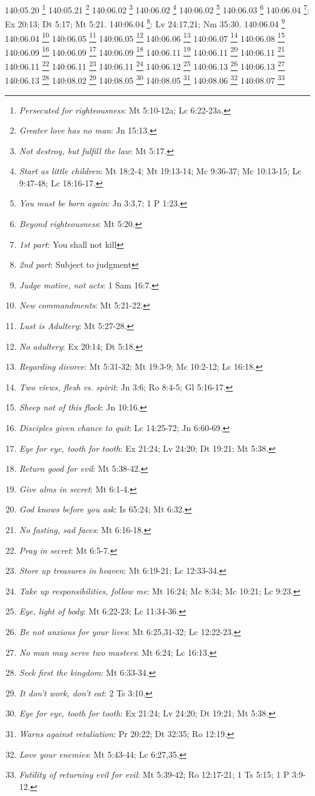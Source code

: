 {{{{{{{{{{{{{{{{{{{{{{{{{{{{{{{{{140:05.20 \footnote{\textit{Persecuted for righteousness}: Mt 5:10-12a; Lc 6:22-23a.}
140:05.21 \footnote{\textit{Greater love has no man}: Jn 15:13.}
140:06.02 \footnote{\textit{Not destroy, but fulfill the law}: Mt 5:17.}
140:06.02 \footnote{\textit{Start as little children}: Mt 18:2-4; Mt 19:13-14; Mc 9:36-37; Mc 10:13-15; Lc 9:47-48; Lc 18:16-17.}
140:06.02 \footnote{\textit{You must be born again}: Jn 3:3,7; 1 P 1:23.}
140:06.03 \footnote{\textit{Beyond righteousness}: Mt 5:20.}
140:06.04 \footnote{\textit{1st part}: You shall not kill}: Ex 20:13; Dt 5:17; Mt 5:21.}
140:06.04 \footnote{\textit{2nd part}: Subject to judgment}: Lv 24:17,21; Nm 35:30.}
140:06.04 \footnote{\textit{Judge motive, not acts}: 1 Sam 16:7.}
140:06.04 \footnote{\textit{New commandments}: Mt 5:21-22.}
140:06.05 \footnote{\textit{Lust is Adultery}: Mt 5:27-28.}
140:06.05 \footnote{\textit{No adultery}: Ex 20:14; Dt 5:18.}
140:06.06 \footnote{\textit{Regarding divorce}: Mt 5:31-32; Mt 19:3-9; Mc 10:2-12; Lc 16:18.}
140:06.07 \footnote{\textit{Two views, flesh vs. spirit}: Jn 3:6; Ro 8:4-5; Gl 5:16-17.}
140:06.08 \footnote{\textit{Sheep not of this flock}: Jn 10:16.}
140:06.09 \footnote{\textit{Disciples given chance to quit}: Lc 14:25-72; Jn 6:60-69.}
140:06.09 \footnote{\textit{Eye for eye, tooth for tooth}: Ex 21:24; Lv 24:20; Dt 19:21; Mt 5:38.}
140:06.09 \footnote{\textit{Return good for evil}: Mt 5:38-42.}
140:06.11 \footnote{\textit{Give alms in secret}: Mt 6:1-4.}
140:06.11 \footnote{\textit{God knows before you ask}: Is 65:24; Mt 6:32.}
140:06.11 \footnote{\textit{No fasting, sad faces}: Mt 6:16-18.}
140:06.11 \footnote{\textit{Pray in secret}: Mt 6:5-7.}
140:06.11 \footnote{\textit{Store up treasures in heaven}: Mt 6:19-21; Lc 12:33-34.}
140:06.11 \footnote{\textit{Take up responsibilities, follow me}: Mt 16:24; Mc 8:34; Mc 10:21; Lc 9:23.}
140:06.12 \footnote{\textit{Eye, light of body}: Mt 6:22-23; Lc 11:34-36.}
140:06.13 \footnote{\textit{Be not anxious for your lives}: Mt 6:25,31-32; Lc 12:22-23.}
140:06.13 \footnote{\textit{No man may serve two masters}: Mt 6:24; Lc 16:13.}
140:06.13 \footnote{\textit{Seek first the kingdom}: Mt 6:33-34.}
140:08.02 \footnote{\textit{It don't work, don't eat}: 2 Ts 3:10.}
140:08.05 \footnote{\textit{Eye for eye, tooth for tooth}: Ex 21:24; Lv 24:20; Dt 19:21; Mt 5:38.}
140:08.05 \footnote{\textit{Warns against retaliation}: Pr 20:22; Dt 32:35; Ro 12:19.}
140:08.06 \footnote{\textit{Love your enemies}: Mt 5:43-44; Lc 6:27,35.}
140:08.07 \footnote{\textit{Futility of returning evil for evil}: Mt 5:39-42; Ro 12:17-21; 1 Ts 5:15; 1 P 3:9-12.}
}}}}}}}}}}}}}}}}}}}}}}}}}}}}}}}
